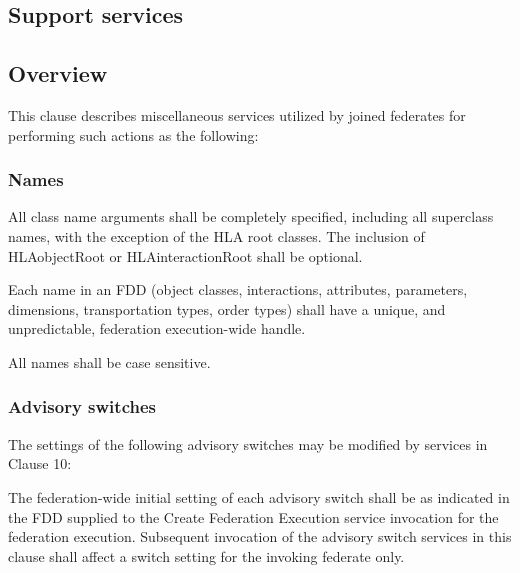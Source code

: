 
\clearpage

\begin{compactstdpage}

    \section{Support services}

    \subsection{Overview}

    This clause describes miscellaneous services utilized by joined federates for performing such actions as the following:


    \subsubsection{Names}

    All class name arguments shall be completely specified, including all superclass names, with the exception of the HLA root classes. The inclusion of HLAobjectRoot or HLAinteractionRoot shall be optional.

    Each name in an FDD (object classes, interactions, attributes, parameters, dimensions, transportation types, order types) shall have a unique, and unpredictable, federation execution-wide handle.

    All names shall be case sensitive.

    \subsubsection{Advisory switches}

    The settings of the following advisory switches may be modified by services in Clause 10:

    The federation-wide initial setting of each advisory switch shall be as indicated in the FDD supplied to the Create Federation Execution service invocation for the federation execution. Subsequent invocation of the advisory switch services in this clause shall affect a switch setting for the invoking federate only.


\end{compactstdpage}

